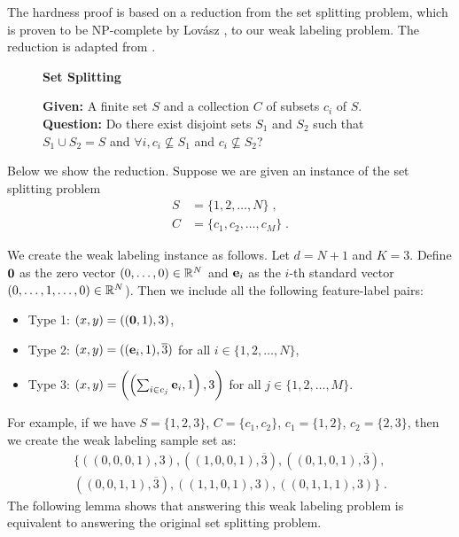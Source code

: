 The hardness proof is based on a reduction from the set splitting problem, which
is proven to be NP-complete by Lov\'asz \cite{Garey-Johnson-1979}, to our weak
labeling problem. The reduction is adapted from \cite{Blum-Rivest-1993}.
\begin{figure}[H]
\begin{framed}
\begin{center}
    \textbf{Set Splitting}
\end{center}
\textbf{Given:} A finite set $S$ and a collection $C$ of subsets $c_i$ of $S$. \\
\textbf{Question:} Do there exist disjoint sets $S_1$ and $S_2$ such that $S_1 \cup S_2 = S$ and $\forall i, c_i\not\subseteq S_1$ and $c_i\not\subseteq S_2$?
\end{framed}
\end{figure}

Below we show the reduction. Suppose we are given an instance of the set
splitting problem
\begin{align*}
S & = \{1, 2, \dots, N\} \; , \\
C & = \{c_1, c_2, \dots, c_M\} \; .
\end{align*}

We create the weak labeling instance as follows. Let $d=N+1$ and $K=3$.
Define $\mathbf{0}$ as the zero vector $(0,\dots,0)\in \mathbb{R}^N$ and $\mathbf{e}_i$ as the
$i$-th standard vector $(0,\dots, 1, \dots, 0)\in \mathbb{R}^N$). Then we include all
the following feature-label pairs:
\begin{itemize}
\item Type 1: $(x,y)=((\mathbf{0},1), 3)$,
\item Type 2: $(x,y)=((\mathbf{e}_i,1), \overline{3})$ for all $i \in \{1,2,\dots,N\}$,
\item Type 3: $(x,y)=\left(\left(\sum_{i\in c_j} \mathbf{e}_i, 1\right), 3\right)$ for all $j \in \{1,2,\dots,M\}$.
\end{itemize}

For example, if we have $S=\{1,2,3\}$, $C=\{c_1, c_2\}$, $c_1 = \{1,2\}$,
$c_2=\{2,3\}$, then we create the weak labeling sample set as:
\begin{multline*}
\{
((0,0,0,1),3), ((1,0,0,1),\overline{3}), ((0,1,0,1),\overline{3}), \\
((0,0,1,1),\overline{3}), ((1,1,0,1),3), ((0,1,1,1),3)
\} \; .
\end{multline*}
The following lemma shows that answering this weak labeling problem is
equivalent to answering the original set splitting problem.

